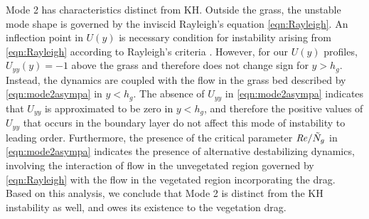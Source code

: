 \documentclass{jfm}
\newcommand{\hg}{h_g}
\newcommand{\Ndg}{\tilde{N}_g}
\begin{document}
Mode 2 has characteristics distinct from KH. Outside the grass, the unstable mode shape is governed by the inviscid Rayleigh's equation \eqref{eqn:Rayleigh}.
An inflection point in $U(y)$ is necessary condition for instability arising from \eqref{eqn:Rayleigh} according to Rayleigh's criteria \citep{Rayleigh1879}. 
However, for our $U(y)$ profiles, $U_{yy}(y) = -1$ above the grass and therefore does not change sign for $y>\hg$. 
Instead, the dynamics are coupled with the flow in the grass bed described by \eqref{eqn:mode2asympa} in $y< \hg$.
The absence of $U_{yy}$ in \eqref{eqn:mode2asympa} indicates that $U_{yy}$ is approximated to be zero in $y<\hg$, and therefore the positive values of $U_{yy}$ that occurs in the boundary layer do not affect this mode of instability to leading order.
Furthermore, the presence of the critical parameter $\Rey/\Ndg$ in \eqref{eqn:mode2asympa} indicates the presence of alternative destabilizing dynamics, involving the interaction of flow in the unvegetated region governed by \eqref{eqn:Rayleigh} with the flow in the vegetated region incorporating the drag.
Based on this analysis, we conclude that Mode 2 is distinct from the KH instability as well, and owes its existence to the vegetation drag.

\end{document}
